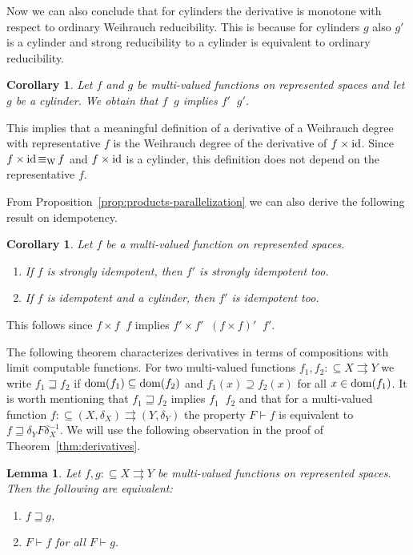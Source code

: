 \documentclass[a4paper]{amsart}
\def\In{\subseteq}
\def\mto{\rightrightarrows}
\def\id{{\rm id}}
\def\dom{{\rm dom}}
\def\leqW{\mathop{\leq_{\mathrm{W}}}}
\def\equivW{\mathop{\equiv_{\mathrm{W}}}}
\def\leqSW{\mathop{\leq_{\mathrm{sW}}}}
\def\equivSW{\mathop{\equiv_{\mathrm{sW}}}}
\newtheorem{lemma}[theorem]{Lemma}
\newtheorem{corollary}[theorem]{Corollary}
\theoremstyle{definition}
\begin{document}
Now we can also conclude that for cylinders the derivative is monotone with respect to ordinary 
Weihrauch reducibility. This is because for cylinders $g$ also $g'$ is a cylinder and strong reducibility
to a cylinder is equivalent to ordinary reducibility.

\begin{corollary}
\label{cor:monotone-derivative}
Let $f$ and $g$ be multi-valued functions on represented spaces and let $g$ be a cylinder.
We obtain that $f\leqW g$ implies $f'\leqW g'$.
\end{corollary}

This implies that a meaningful definition of a derivative of a Weihrauch degree 
with representative $f$ is the Weihrauch degree of the derivative of $f\times\id$.
Since $f\times\id\equivW f$ and $f\times\id$ is a cylinder, this definition does not depend
on the representative $f$. 

From Proposition~\ref{prop:products-parallelization} we can also derive the following result on idempotency.

\begin{corollary}
\label{cor:idempotent}
Let $f$ be a multi-valued function on represented spaces.
\begin{enumerate}
\item If $f$ is strongly idempotent, then $f'$ is strongly idempotent too.
\item If $f$ is idempotent and a cylinder, then $f'$ is idempotent too.
\end{enumerate}
\end{corollary}

This follows since $f\times f\leqSW f$ implies $f'\times f'\equivSW(f\times f)'\leqSW f'$.

The following theorem characterizes derivatives in terms of compositions with limit computable
functions. 
For two multi-valued functions $f_1,f_2:\In X\mto Y$ we write $f_1\sqsupseteq f_2$
if $\dom(f_1)\In\dom(f_2)$ and $f_1(x)\supseteq f_2(x)$ for all $x\in\dom(f_1)$.
It is worth mentioning that $f_1\sqsupseteq f_2$ implies $f_1\leqSW f_2$
and that for a multi-valued function $f:\In (X,\delta_X)\mto(Y,\delta_Y)$ the property $F\vdash f$ is
equivalent to $f\sqsupseteq \delta_YF\delta_X^{-1}$.
We will use the following observation in the proof of Theorem~\ref{thm:derivatives}.

\begin{lemma}
\label{lem:realizers-extensions}
Let $f,g:\In X\mto Y$ be multi-valued functions on represented spaces.
Then the following are equivalent:
\begin{enumerate}
\item $f\sqsupseteq g$,
\item $F\vdash f$ for all $F\vdash g$.
\end{enumerate}
\end{lemma}
\end{document}
